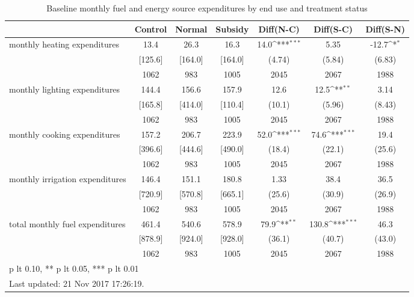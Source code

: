 \begin{table}[htbp]\centering
\def\sym#1{\ifmmode^{#1}\else\(^{#1}\)\fi}
\caption{Baseline monthly fuel and energy source expenditures by end use and treatment status \label{tab:"balance"}}
\begin{tabular*}{1\hsize}{@{\hskip\tabcolsep\extracolsep\fill}l*{1}{cccccc}}
\toprule
                                &  Control&   Normal&  Subsidy&Diff(N-C)         &Diff(S-C)         &Diff(S-N)         \\
\midrule
monthly heating expenditures    &     13.4&     26.3&     16.3&     14.0\sym{***}&     5.35         &    -12.7\sym{*}  \\
                                &  [125.6]&  [164.0]&  [164.0]&   (4.74)         &   (5.84)         &   (6.83)         \\
                                &     1062&      983&     1005&     2045         &     2067         &     1988         \\
monthly lighting expenditures   &    144.4&    156.6&    157.9&     12.6         &     12.5\sym{**} &     3.14         \\
                                &  [165.8]&  [414.0]&  [110.4]&   (10.1)         &   (5.96)         &   (8.43)         \\
                                &     1062&      983&     1005&     2045         &     2067         &     1988         \\
monthly cooking expenditures    &    157.2&    206.7&    223.9&     52.0\sym{***}&     74.6\sym{***}&     19.4         \\
                                &  [396.6]&  [444.6]&  [490.0]&   (18.4)         &   (22.1)         &   (25.6)         \\
                                &     1062&      983&     1005&     2045         &     2067         &     1988         \\
monthly irrigation expenditures &    146.4&    151.1&    180.8&     1.33         &     38.4         &     36.5         \\
                                &  [720.9]&  [570.8]&  [665.1]&   (25.6)         &   (30.9)         &   (26.9)         \\
                                &     1062&      983&     1005&     2045         &     2067         &     1988         \\
total monthly fuel expenditures &    461.4&    540.6&    578.9&     79.9\sym{**} &    130.8\sym{***}&     46.3         \\
                                &  [878.9]&  [924.0]&  [928.0]&   (36.1)         &   (40.7)         &   (43.0)         \\
                                &     1062&      983&     1005&     2045         &     2067         &     1988         \\
\bottomrule
\multicolumn{7}{l}{\footnotesize * p lt 0.10, ** p lt 0.05, *** p lt 0.01}\\
\multicolumn{7}{l}{\footnotesize Last updated: 21 Nov 2017 17:26:19.}\\
\end{tabular*}
\end{table}
